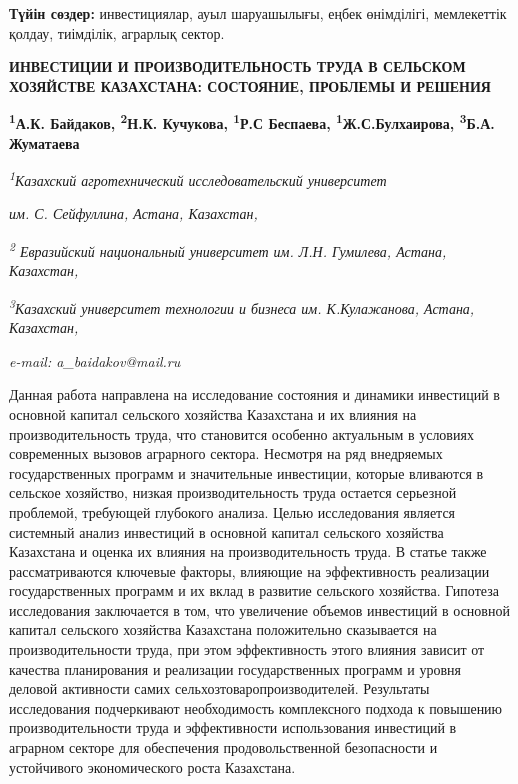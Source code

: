 {\bfseries Түйін сөздер:} инвестициялар, ауыл шаруашылығы, еңбек
өнімділігі, мемлекеттік қолдау, тиімділік, аграрлық сектор.

\begin{articleheader}
{\bfseries ИНВЕСТИЦИИ И ПРОИЗВОДИТЕЛЬНОСТЬ ТРУДА В СЕЛЬСКОМ ХОЗЯЙСТВЕ
КАЗАХСТАНА: СОСТОЯНИЕ, ПРОБЛЕМЫ И РЕШЕНИЯ}

{\bfseries \textsuperscript{1}А.К. Байдаков\textsuperscript{\envelope },
\textsuperscript{2}Н.К. Кучукова,
\textsuperscript{1}Р.С Беспаева,
\textsuperscript{1}Ж.С.Булхаирова,
\textsuperscript{3}Б.А. Жуматаева}
\end{articleheader}

\begin{affiliation}
\emph{\textsuperscript{1}Казахский агротехнический исследовательский
университет}

\emph{им. С. Сейфуллина, Астана, Казахстан,}

\emph{\textsuperscript{2} Евразийский национальный университет им. Л.Н.
Гумилева, Астана, Казахстан,}

\emph{\textsuperscript{3}Казахский университет технологии и бизнеса им.
К.Кулажанова, Астана, Казахстан,}

\emph{e-mail: a\_baidakov@mail.ru}
\end{affiliation}

Данная работа направлена на исследование состояния и динамики инвестиций
в основной капитал сельского хозяйства Казахстана и их влияния на
производительность труда, что становится особенно актуальным в условиях
современных вызовов аграрного сектора. Несмотря на ряд внедряемых
государственных программ и значительные инвестиции, которые вливаются в
сельское хозяйство, низкая производительность труда остается серьезной
проблемой, требующей глубокого анализа. Целью исследования является
системный анализ инвестиций в основной капитал сельского хозяйства
Казахстана и оценка их влияния на производительность труда. В статье
также рассматриваются ключевые факторы, влияющие на эффективность
реализации государственных программ и их вклад в развитие сельского
хозяйства. Гипотеза исследования заключается в том, что увеличение
объемов инвестиций в основной капитал сельского хозяйства Казахстана
положительно сказывается на производительности труда, при этом
эффективность этого влияния зависит от качества планирования и
реализации государственных программ и уровня деловой активности самих
сельхозтоваропроизводителей. Результаты исследования подчеркивают
необходимость комплексного подхода к повышению производительности труда
и эффективности использования инвестиций в аграрном секторе для
обеспечения продовольственной безопасности и устойчивого экономического
роста Казахстана.

